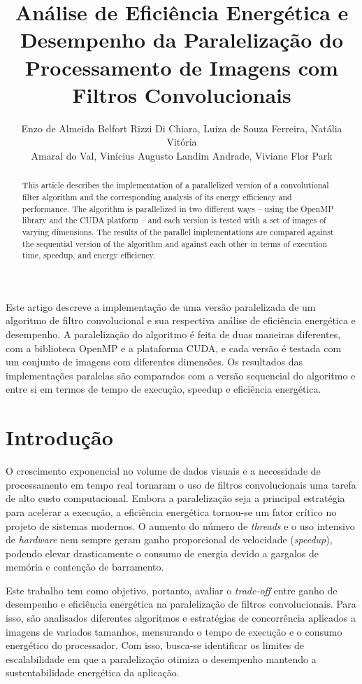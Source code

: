 \documentclass[12pt]{article}
\title{Análise de Eficiência Energética e Desempenho da Paralelização do Processamento de Imagens com Filtros Convolucionais}
\author{Enzo de Almeida Belfort Rizzi Di Chiara\inst{1}, Luiza de Souza Ferreira\inst{1}, Natália Vitória\\Amaral do Val\inst{1}, Vinícius Augusto Landim Andrade\inst{1}, Viviane Flor Park\inst{1} 
}
\begin{document}
 

\maketitle

\begin{abstract}
  This article describes the implementation of a parallelized version of a convolutional filter algorithm and the corresponding analysis of its energy efficiency and performance. The algorithm is parallelized in two different ways -- using the OpenMP library and the CUDA platform -- and each version is tested with a set of images of varying dimensions. The results of the parallel implementations are compared against the sequential version of the algorithm and against each other in terms of execution time, speedup, and energy efficiency.
\end{abstract}
     
\begin{resumo} 
  Este artigo descreve a implementação de uma versão paralelizada de um algoritmo de filtro convolucional e sua respectiva análise de eficiência energética e desempenho. A paralelização do algoritmo é feita de duas maneiras diferentes, com a biblioteca OpenMP e a plataforma CUDA, e cada versão é testada com um conjunto de imagens com diferentes dimensões. Os resultados das implementações paralelas são comparados com a versão sequencial do algoritmo e entre si em termos de tempo de execução, speedup e eficiência energética.
\end{resumo}


\section{Introdução}

O crescimento exponencial no volume de dados visuais e a necessidade de processamento em tempo real tornaram o uso de filtros convolucionais uma tarefa de alto custo computacional. Embora a paralelização seja a principal estratégia para acelerar a execução, a eficiência energética tornou-se um fator crítico no projeto de sistemas modernos. O aumento do número de \textit{threads} e o uso intensivo de \textit{hardware} nem sempre geram ganho proporcional de velocidade (\textit{speedup}), podendo elevar drasticamente o consumo de energia devido a gargalos de memória e contenção de barramento.

Este trabalho tem como objetivo, portanto, avaliar o \textit{trade-off} entre ganho de desempenho e eficiência energética na paralelização de filtros convolucionais. Para isso, são analisados diferentes algoritmos e estratégias de concorrência aplicados a imagens de variados tamanhos, mensurando o tempo de execução e o consumo energético do processador. Com isso, busca-se identificar os limites de escalabilidade em que a paralelização otimiza o desempenho mantendo a sustentabilidade energética da aplicação.
\end{document}
